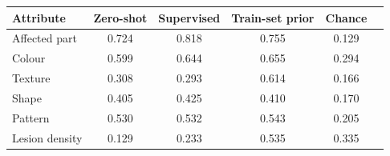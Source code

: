 \begin{tabular}{lccccc}\toprule Attribute & Zero-shot & Supervised & Train-set prior & Chance\\\midrule
Affected part & 0.724 & 0.818 & 0.755 & 0.129\\
Colour & 0.599 & 0.644 & 0.655 & 0.294\\
Texture & 0.308 & 0.293 & 0.614 & 0.166\\
Shape & 0.405 & 0.425 & 0.410 & 0.170\\
Pattern & 0.530 & 0.532 & 0.543 & 0.205\\
Lesion density & 0.129 & 0.233 & 0.535 & 0.335\\
\bottomrule\end{tabular}
